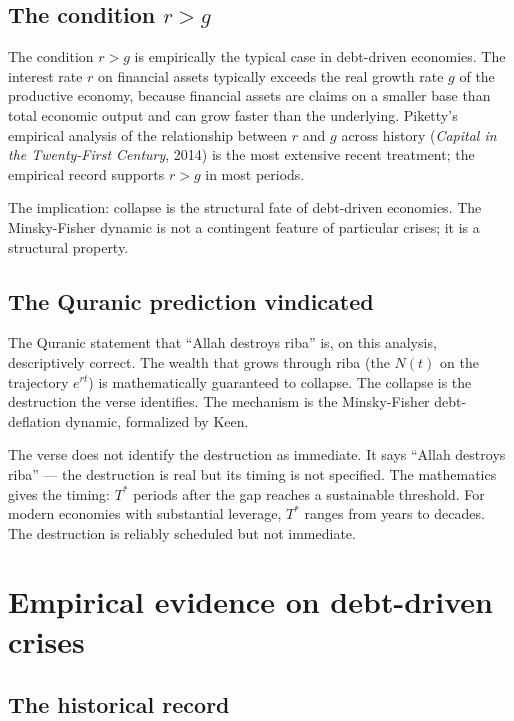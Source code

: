 \subsection{The condition $r > g$}

The condition $r > g$ is empirically the typical case in
debt-driven economies. The interest rate $r$ on financial assets
typically exceeds the real growth rate $g$ of the productive
economy, because financial assets are claims on a smaller base
than total economic output and can grow faster than the underlying.
Piketty's empirical analysis of the relationship between $r$ and
$g$ across history (\emph{Capital in the Twenty-First Century},
2014) is the most extensive recent treatment; the empirical record
supports $r > g$ in most periods.

The implication: collapse is the structural fate of debt-driven
economies. The Minsky-Fisher dynamic is not a contingent feature
of particular crises; it is a structural property.

\subsection{The Quranic prediction vindicated}

The Quranic statement that ``Allah destroys riba'' is, on this
analysis, descriptively correct. The wealth that grows through
riba (the $N(t)$ on the trajectory $e^{rt}$) is mathematically
guaranteed to collapse. The collapse is the destruction the verse
identifies. The mechanism is the Minsky-Fisher debt-deflation
dynamic, formalized by Keen.

The verse does not identify the destruction as immediate. It says
``Allah destroys riba'' --- the destruction is real but its
timing is not specified. The mathematics gives the timing: $T^*$
periods after the gap reaches a sustainable threshold. For modern
economies with substantial leverage, $T^*$ ranges from years to
decades. The destruction is reliably scheduled but not immediate.

\section{Empirical evidence on debt-driven crises}
\label{sec:riba-empirical}

\subsection{The historical record}

